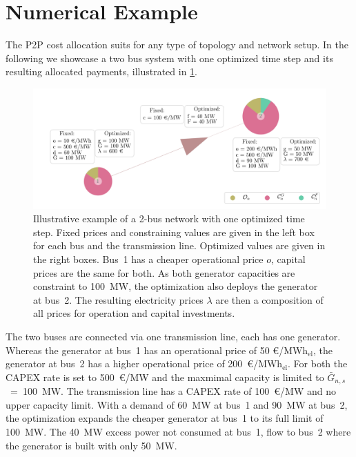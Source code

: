 \documentclass[11pt,twocolumn]{article}
\newcommand{\capacityGenerationUpper}{\bar{G}_{n,s}}
\newcommand{\megawatthour}{MWh$_\text{el}$}
\begin{document}
\section{Numerical Example}
\label{sec:numerical_example}
The P2P cost allocation suits for any type of topology and network setup. In the following we showcase a two bus system with one optimized time step and its resulting allocated payments, illustrated in \cref{fig:example_network}. \\
% 
% 
\begin{figure}[t]
\centering
\includegraphics[width=\linewidth]{example_network.png}
\caption{Illustrative example of a 2-bus network with one optimized time step. Fixed prices and constraining values are given in the left box for each bus and the transmission line. Optimized values are given in the right boxes. Bus~1 has a cheaper operational price $o$, capital prices are the same for both. As both generator capacities are constraint to 100~MW, the optimization also deploys the generator at bus~2. The resulting electricity prices $\lambda$ are then a composition of all prices for operation and capital investments. \vspace{-10pt}}
\label{fig:example_network}
\end{figure}
% 
% 
The two buses are connected via one transmission line, each has one generator. Whereas the generator at bus~1 has an operational price of 50 \euro/\megawatthour, the generator at bus~2 has a higher operational price of 200~\euro/\megawatthour. For both the CAPEX rate is set to 500~\euro/MW and the maxmimal capacity is limited to $\capacityGenerationUpper$~=~100~MW. The transmission line has a CAPEX rate of 100~\euro/MW and no upper capacity limit. With a demand of 60~MW at bus~1 and 90~MW at bus~2, the optimization expands the cheaper generator at bus~1 to its full limit of 100~MW. The 40~MW excess power not consumed at bus~1, flow to bus~2 where the generator is built with only 50~MW.  \\
% 
% 
\end{document}
